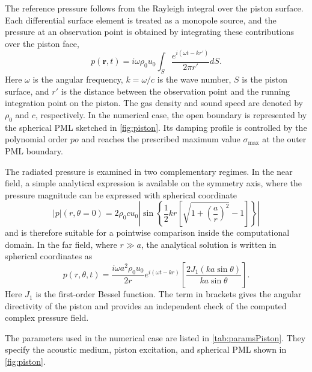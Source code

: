 \documentclass[final,num,12pt]{elsarticle}
\begin{document}
The reference pressure follows from the Rayleigh integral over the piston
surface.  Each differential surface element is treated as a monopole source,
and the pressure at an observation point is obtained by integrating these
contributions over the piston face,
\begin{equation}
    p(\mathbf{r},t)=i\omega \rho_0 u_0\int_{S}\frac{e^{i(\omega t-kr')}}{2\pi r'}dS.
\end{equation}
Here $\omega$ is the angular frequency, $k=\omega/c$ is the wave number,
$S$ is the piston surface, and $r'$ is the distance between the observation
point and the running integration point on the piston.  The gas density and
sound speed are denoted by $\rho_0$ and $c$, respectively.  In the numerical
case, the open boundary is represented by the spherical PML sketched in
\cref{fig:piston}.  Its damping profile is controlled by the polynomial order
$po$ and reaches the prescribed maximum value $\sigma_{\max}$ at the outer PML
boundary.

The radiated pressure is examined in two complementary regimes.  In the near
field, a simple analytical expression is available on the symmetry axis, where
the pressure magnitude can be expressed with spherical coordinate
\begin{equation}
    |p|(r,\theta=0) = 2\rho_0cu_0 \left| \sin\left\{ \frac{1}{2}kr\left[\sqrt{1+\left(\frac{a}{r}\right)^2}-1\right] \right\} \right|
    \label{fc:nearField}
\end{equation}
and is therefore suitable for a pointwise comparison inside the computational
domain.  In the far field, where $r\gg a$, the analytical solution is written
in spherical coordinates as
\begin{equation}
    p(r,\theta,t)= \frac{i\omega a ^2\rho_0u_0}{2r}e^{i(\omega t-kr)}\left[\frac{2J_1(ka\sin\theta)}{ka\sin\theta}\right].
    \label{fc:farField}
\end{equation}
Here $J_1$ is the first-order Bessel function.  The term in brackets gives the
angular directivity of the piston and provides an independent check of the
computed complex pressure field.

The parameters used in the numerical case are listed in \cref{tab:paramsPiston}.
They specify the acoustic medium, piston excitation, and spherical PML shown in
\cref{fig:piston}.
\end{document}
